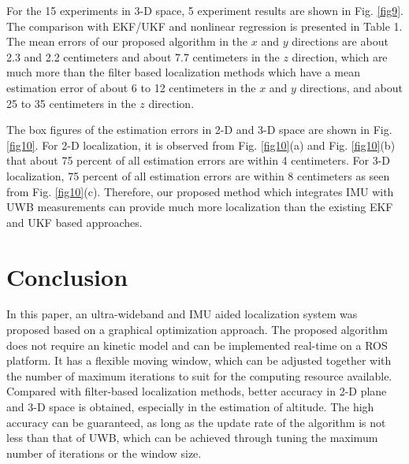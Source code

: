 \documentclass[journal]{IEEEtran}
\begin{document}
For the 15 experiments in 3-D space, 5 experiment results are shown in Fig. \ref{fig9}. The comparison with EKF/UKF and nonlinear regression is presented in Table 1. The mean errors of our proposed algorithm in the $x$ and $y$ directions are about 2.3 and 2.2 centimeters and about 7.7 centimeters in the $z$ direction, which are much more  than the filter based localization methods which have a mean estimation error of about 6 to 12 centimeters in the $x$ and $y$ directions, and about 25 to 35 centimeters in the $z$ direction.

The box figures of the estimation errors in 2-D and 3-D space are shown in Fig. \ref{fig10}. For 2-D localization, it is observed from  Fig. \ref{fig10}(a) and Fig. \ref{fig10}(b) that about 75 percent of all estimation errors are within 4 centimeters. For 3-D localization, 75 percent of all estimation errors are within 8 centimeters as seen from Fig. \ref{fig10}(c). Therefore, our proposed method which integrates IMU with UWB measurements can provide much more  localization than the existing EKF and UKF based approaches.



\section{Conclusion}\label{a9}

In this paper, an ultra-wideband and IMU aided localization system was proposed based on a graphical optimization approach. The proposed algorithm does not require an  kinetic model and can be implemented real-time on a ROS platform. It has a flexible moving window, which can be adjusted together with the number of maximum iterations to suit for the computing resource available. Compared with filter-based localization methods, better accuracy in 2-D plane and 3-D space is obtained, especially in the estimation of altitude. The high accuracy can be guaranteed, as long as the update rate of the algorithm is not less than that of UWB, which can be achieved through tuning the maximum number of iterations or the window size.

%
%
\end{document}
